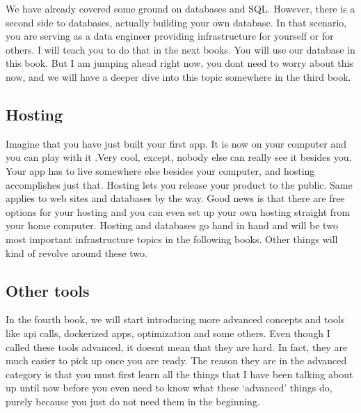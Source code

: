 \documentclass[]{book}
\begin{document}
We have already covered some ground on databases and SQL. However, there is a second side to databases, actually building your own database. In that scenario, you are serving as a data engineer providing infrastructure for yourself or for others. I will teach you to do that in the next books. You will use our database in this book. But I am jumping ahead right now, you dont need to worry about this now, and we will have a deeper dive into this topic somewhere in the third book.

\hypertarget{hosting}{%
\subsection{Hosting}\label{hosting}}

Imagine that you have just built your first app. It is now on your computer and you can play with it .Very cool, except, nobody else can really see it besides you. Your app has to live somewhere else besides your computer, and hosting accomplishes just that. Hosting lets you release your product to the public. Same applies to web sites and databases by the way. Good news is that there are free options for your hosting and you can even set up your own hosting straight from your home computer. Hosting and databases go hand in hand and will be two most important infrastructure topics in the following books. Other things will kind of revolve around these two.

\hypertarget{other-tools}{%
\subsection{Other tools}\label{other-tools}}

In the fourth book, we will start introducing more advanced concepts and tools like api calls, dockerized apps, optimization and some others. Even though I called these tools advanced, it doesnt mean that they are hard. In fact, they are much easier to pick up once you are ready. The reason they are in the advanced category is that you must first learn all the things that I have been talking about up until now before you even need to know what these `advanced' things do, purely because you just do not need them in the beginning.
\end{document}
